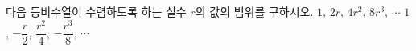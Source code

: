 다음 등비수열이 수렴하도록 하는 실수 $r$의 값의 범위를 구하시오.
 $1$, $2r$, $4r^2$, $8r^3$, $\cdots$
 $1$, $-\dfrac{r}{2}$, $\dfrac{r^2}{4}$, $-\dfrac{r^3}{8}$, $\cdots$
